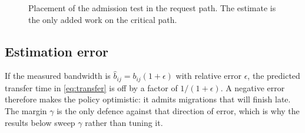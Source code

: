 \begin{figure}[t]
  \centering
  \caption{Placement of the admission test in the request path.
           The estimate is the only added work on the critical path.}
  \label{fig:pipeline}
\end{figure}

\subsection{Estimation error}

If the measured bandwidth is $\hat{b}_{ij} = b_{ij}(1+\epsilon)$ with relative error $\epsilon$, the predicted transfer time in \eqref{eq:transfer} is off by a factor of $1/(1+\epsilon)$.
A negative error therefore makes the policy optimistic: it admits migrations that will finish late.
The margin $\gamma$ is the only defence against that direction of error, which is why the results below sweep $\gamma$ rather than tuning it.
